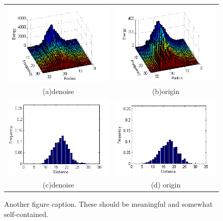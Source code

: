 \begin{enumerate}
\begin{figure}
\begin{center}
\begin{tabular}{cc}   %
   \includegraphics[width=0.45\linewidth]{scantosearch_test_SH_scanned} & 
   \includegraphics[width=0.45\linewidth]{scantosearch_test_SH_matched}  \\
   (a)denoise & (b)origin                                                     \\
   \includegraphics[width=0.45\linewidth]{scantosearch_test_DH_scanned} &
   \includegraphics[width=0.45\linewidth]{scantosearch_test_DH_matched}  \\
   (c)denoise & (d) origin                                                    \\
\end{tabular}
\caption{Another figure caption. These should be meaningful and somewhat self-contained.} 
  \label{scantosearchtest_analysis}
\end{center}
\end{figure}


\end{enumerate}
